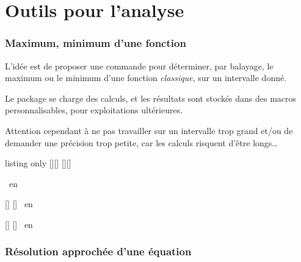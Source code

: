 \part{Outils pour l'analyse}

\section{Maximum, minimum d'une fonction}\label{maxmin}

\begin{tipblock}
 L'idée est de proposer une commande pour déterminer, par balayage, le maximum ou le minimum d'une fonction \textit{classique}, sur un intervalle donné.

\smallskip

Le package  se charge des calculs, et les résultats sont stockés dans des macros personnalisables, pour exploitations ultérieures.

\smallskip

{\small\faBomb} Attention cependant à ne pas travailler sur un intervalle trop grand et/ou de demander une précision trop petite, car les calculs risquent d'être longs\ldots
\end{tipblock}

\begin{PresCodeTexPL}{listing only}
[\tmpmax][\tmpmaxvalx]
[\tmpmin][\tmpminvalx]
\end{PresCodeTexPL}

\begin{PresCodePL}{}
\tmpmax\ en \tmpmaxvalx
\end{PresCodePL}

\begin{PresCodePL}{}
	[\MonMax]
	[\MonMaxX]
\MonMax\ en \MonMaxX
\end{PresCodePL}

\begin{PresCodePL}{}
	[\MonMin]
	[\MonMinX]
\MonMin\ en \MonMinX
\end{PresCodePL}

\pagebreak

\section{Résolution approchée d'une équation}\label{resolapprox}

